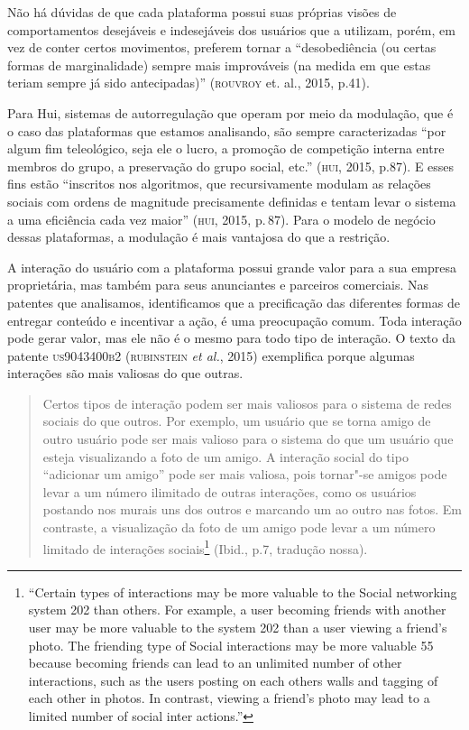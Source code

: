 Não há dúvidas de que cada plataforma possui suas próprias visões de
comportamentos desejáveis e indesejáveis dos usuários que a utilizam,
porém, em vez de conter certos movimentos, preferem tornar a
``desobediência (ou certas formas de marginalidade) sempre mais
improváveis (na medida em que estas teriam sempre já sido antecipadas)''
(\textsc{rouvroy} et. al., 2015, p.41).

Para Hui, sistemas de autorregulação que operam por meio da modulação,
que é o caso das plataformas que estamos analisando, são sempre
caracterizadas ``por algum fim teleológico, seja ele o lucro, a promoção
de competição interna entre membros do grupo, a preservação do grupo
social, etc.'' (\textsc{hui}, 2015, p.87). E esses fins estão ``inscritos nos
algoritmos, que recursivamente modulam as relações sociais com ordens de
magnitude precisamente definidas e tentam levar o sistema a uma
eficiência cada vez maior'' (\textsc{hui}, 2015, p.\,87). Para o modelo de negócio
dessas plataformas, a modulação é mais vantajosa do que a restrição.

A interação do usuário com a plataforma possui grande valor para a sua
empresa proprietária, mas também para seus anunciantes e parceiros
comerciais. Nas patentes que analisamos, identificamos que a
precificação das diferentes formas de entregar conteúdo e incentivar a
ação, é uma preocupação comum. Toda interação pode gerar valor, mas ele
não é o mesmo para todo tipo de interação. O texto da patente
\textsc{us9043400b2} (\textsc{rubinstein} \emph{et al.}, 2015) exemplifica porque algumas
interações são mais valiosas do que outras.

\begin{quote}
Certos tipos de interação podem ser mais valiosos para o sistema de
redes sociais do que outros. Por exemplo, um usuário que se torna amigo
de outro usuário pode ser mais valioso para o sistema do que um usuário
que esteja visualizando a foto de um amigo. A interação social do tipo
``adicionar um amigo'' pode ser mais valiosa, pois tornar"-se amigos pode
levar a um número ilimitado de outras interações, como os usuários
postando nos murais uns dos outros e marcando um ao outro nas fotos. Em
contraste, a visualização da foto de um amigo pode levar a um número
limitado de interações sociais\footnote{``Certain types of interactions
  may be more valuable to the Social networking system 202 than others.
  For example, a user becoming friends with another user may be more
  valuable to the system 202 than a user viewing a friend's photo. The
  friending type of Social interactions may be more valuable 55 because
  becoming friends can lead to an unlimited number of other
  interactions, such as the users posting on each others walls and
  tagging of each other in photos. In contrast, viewing a friend's photo
  may lead to a limited number of social inter actions.''} (Ibid., p.7,
tradução nossa).
\end{quote}


